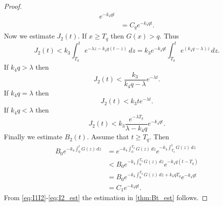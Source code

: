 \documentclass[pdflatex,sn-mathphys-num]{sn-jnl}
\theoremstyle{thmstyleone}
\theoremstyle{thmstyletwo}
\theoremstyle{thmstylethree}
\begin{document}
\begin{proof}
\begin{align}
e^{-k_4 q t} \nonumber\\
&=C_q e^{-k_4 q t}.
\end{align}
Now we estimate $J_2(t)$. If $x\geq T_q$ then $G(x)>q$. Thus
\begin{equation*}
J_2(t)<k_3 \int_{T_q}^t e^{-\lambda z -k_4 q(t-z)}\,dz=k_3 e^{-k_4 qt}\int_{T_q}^t e^{(k_4 q-\lambda)z}\,dz.
\end{equation*}
If $k_4 q>\lambda$ then 
\begin{equation}\label{eq:J2_first_est}
J_2(t)<\frac{k_3}{k_4q-\lambda} e^{-\lambda t}.
\end{equation}
If $k_4 q=\lambda$ then 
\begin{equation}\label{eq:J2_second_est}
J_2(t)<k_3 t e^{-\lambda t}.
\end{equation}
If $k_4 q<\lambda$ then 
\begin{equation}\label{eq:J2_third_est}
J_2(t)<k_3 \frac{e^{-\lambda T_q}}{\lambda - k_4 q}e^{-k_4 qt}.
\end{equation}
Finally we estimate $B_2(t)$. Assume that $t\geq T_q$. Then 
\begin{align}\label{eq:I2_est}
B_0 e^{-k_4 \int_0^t G(z)\,dz} &=e^{-k_4 \int_0^{T_q} G(z)\,dz} e^{-k_4 \int_{T_q}^t G(z)\,dz} \nonumber\\
&< B_0 e^{-k_4 \int_0^{T_q} G(z)\,dz} e^{-k_4 q(t-T_q)} \nonumber \\
&=B_0 e^{-k_4 \int_0^{T_q} G(z)\,dz +k_4 q T_q} e^{-k_4q t}\nonumber\\
&=C_1 e^{-k_4q t}.
\end{align}
From \eqref{eq:I1I2}-\eqref{eq:I2_est} the estimation in \autoref{thm:Bt_est} follows. 
\end{proof}
\end{document}
